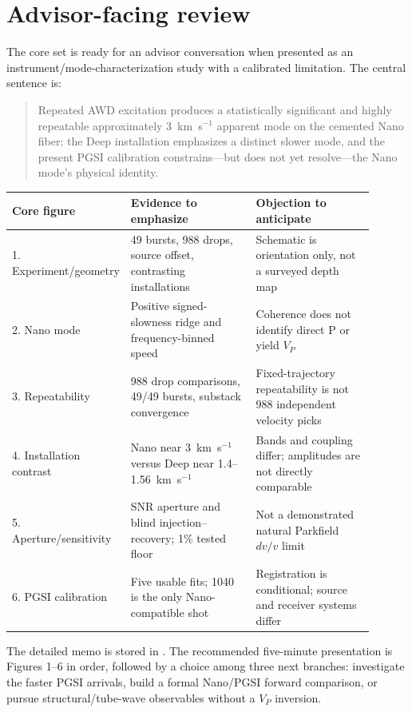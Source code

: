 \documentclass[11pt]{article}
\begin{document}
\clearpage

\section{Advisor-facing review}
The core set is ready for an advisor conversation when presented as an
instrument/mode-characterization study with a calibrated limitation.  The central
sentence is:

\begin{quote}
Repeated AWD excitation produces a statistically significant and highly
repeatable approximately 3~km~s$^{-1}$ apparent mode on the cemented Nano fiber;
the Deep installation emphasizes a distinct slower mode, and the present PGSI
calibration constrains---but does not yet resolve---the Nano mode's physical
identity.
\end{quote}

\begin{center}
\small
\begin{tabular}{p{0.22\linewidth}p{0.35\linewidth}p{0.33\linewidth}}
\toprule
Core figure & Evidence to emphasize & Objection to anticipate \\
\midrule
1. Experiment/geometry & 49 bursts, 988 drops, source offset, contrasting installations & Schematic is orientation only, not a surveyed depth map \\
2. Nano mode & Positive signed-slowness ridge and frequency-binned speed & Coherence does not identify direct P or yield $V_P$ \\
3. Repeatability & 988 drop comparisons, 49/49 bursts, substack convergence & Fixed-trajectory repeatability is not 988 independent velocity picks \\
4. Installation contrast & Nano near 3~km~s$^{-1}$ versus Deep near 1.4--1.56~km~s$^{-1}$ & Bands and coupling differ; amplitudes are not directly comparable \\
5. Aperture/sensitivity & SNR aperture and blind injection--recovery; 1\% tested floor & Not a demonstrated natural Parkfield $dv/v$ limit \\
6. PGSI calibration & Five usable fits; 1040 is the only Nano-compatible shot & Registration is conditional; source and receiver systems differ \\
\bottomrule
\end{tabular}
\end{center}

The detailed memo is stored in
.  The recommended five-minute
presentation is Figures 1--6 in order, followed by a choice among three next
branches: investigate the faster PGSI arrivals, build a formal Nano/PGSI forward
comparison, or pursue structural/tube-wave observables without a $V_P$ inversion.
\end{document}
